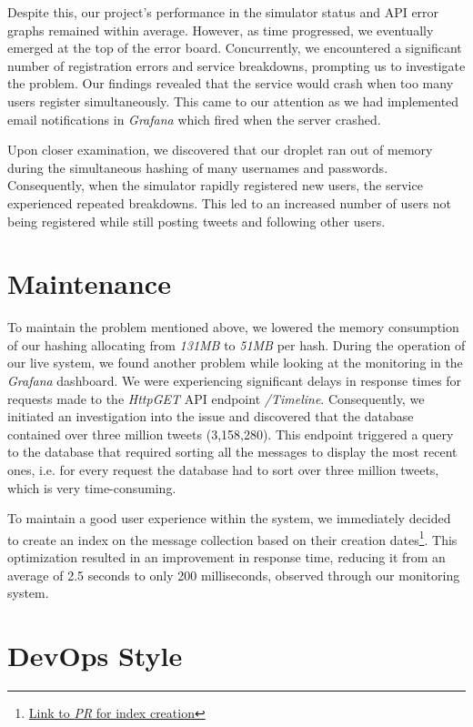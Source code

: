 Despite this, our project's performance in the simulator status and API error graphs remained within average. However, as time progressed, we eventually emerged at the top of the error board. Concurrently, we encountered a significant number of registration errors and service breakdowns, prompting us to investigate the problem. Our findings revealed that the service would crash when too many users register simultaneously. This came to our attention as we had implemented email notifications in \textit{Grafana} which fired when the server crashed. 

Upon closer examination, we discovered that our droplet ran out of memory during the simultaneous hashing of many usernames and passwords. Consequently, when the simulator rapidly registered new users, the service experienced repeated breakdowns. This led to an increased number of users not being registered while still posting tweets and following other users. 

\section{Maintenance}

To maintain the problem mentioned above, we lowered the memory consumption of our hashing allocating from \textit{131MB} to \textit{51MB} per hash. During the operation of our live system, we found another problem while looking at the monitoring in the \textit{Grafana} dashboard. We were experiencing significant delays in response times for requests made to the \textit{HttpGET} API endpoint \textit{/Timeline}. Consequently, we initiated an investigation into the issue and discovered that the database contained over three million tweets (3,158,280). This endpoint triggered a query to the database that required sorting all the messages to display the most recent ones, i.e. for every request the database had to sort over three million tweets, which is very time-consuming.

To maintain a good user experience within the system, we immediately decided to create an index on the message collection based on their creation dates\footnote{\href{https://github.com/simonskodt/itu-minitwit/pull/160/files\#diff-5eb5a300effc823f5495041811fa663ed657a763a0ff63594a760f31967e8733}{Link to \textit{PR} for index creation}}. This optimization resulted in an improvement in response time, reducing it from an average of 2.5 seconds to only 200 milliseconds, observed through our monitoring system.

\section{DevOps Style}

